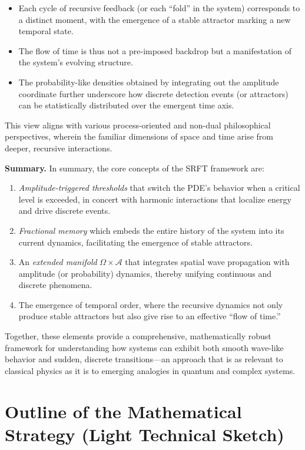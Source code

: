 \documentclass[12pt]{article}
\begin{document}
\begin{itemize}
    \item Each cycle of recursive feedback (or each “fold” in the system) corresponds to a distinct moment, with the emergence of a stable attractor marking a new temporal state.
    \item The flow of time is thus not a pre-imposed backdrop but a manifestation of the system’s evolving structure.
    \item The probability-like densities obtained by integrating out the amplitude coordinate further underscore how discrete detection events (or attractors) can be statistically distributed over the emergent time axis.
\end{itemize}

This view aligns with various process-oriented and non-dual philosophical perspectives, wherein the familiar dimensions of space and time arise from deeper, recursive interactions.

\medskip

\noindent
\textbf{Summary.}  
In summary, the core concepts of the SRFT framework are:
\begin{enumerate}
    \item \emph{Amplitude-triggered thresholds} that switch the PDE’s behavior when a critical level is exceeded, in concert with harmonic interactions that localize energy and drive discrete events.
    \item \emph{Fractional memory} which embeds the entire history of the system into its current dynamics, facilitating the emergence of stable attractors.
    \item An \emph{extended manifold} $\Omega \times \mathcal{A}$ that integrates spatial wave propagation with amplitude (or probability) dynamics, thereby unifying continuous and discrete phenomena.
    \item The emergence of temporal order, where the recursive dynamics not only produce stable attractors but also give rise to an effective “flow of time.”
\end{enumerate}

Together, these elements provide a comprehensive, mathematically robust framework for understanding how systems can exhibit both smooth wave-like behavior and sudden, discrete transitions—an approach that is as relevant to classical physics as it is to emerging analogies in quantum and complex systems.

\section{Outline of the Mathematical Strategy (Light Technical Sketch)}
\label{sec:math_strategy}
\end{document}
